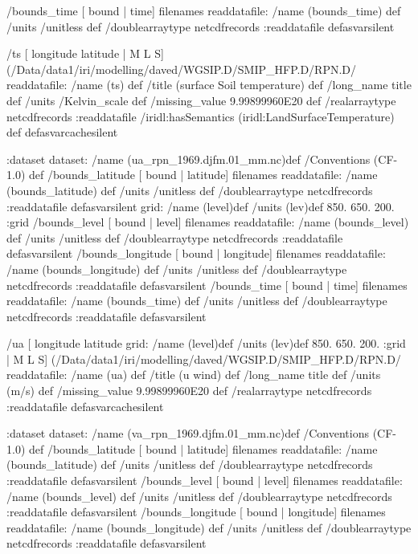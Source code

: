  /bounds_time{
[ bound | time] filenames readdatafile:
/name (bounds_time) def
 /units /unitless def
 /doublearraytype netcdfrecords :readdatafile
}defasvarsilent
\begin{ingrid}
 /ts{
[ longitude latitude | M L S]
(/Data/data1/iri/modelling/daved/WGSIP.D/SMIP_HFP.D/RPN.D/%
readdatafile:
/name (ts) def
 /title (surface Soil temperature) def
/long_name title def
 /units /Kelvin_scale def
 /missing_value 9.99899960E20 def
 /realarraytype netcdfrecords :readdatafile
/iridl:hasSemantics (iridl:LandSurfaceTemperature) def
}defasvarcachesilent
\end{ingrid}
:dataset
dataset:
/name (ua_rpn_1969.djfm.01_mm.nc)def
 /Conventions (CF-1.0) def
 /bounds_latitude{
[ bound | latitude] filenames readdatafile:
/name (bounds_latitude) def
 /units /unitless def
 /doublearraytype netcdfrecords :readdatafile
}defasvarsilent
grid:
/name (level)def
/units (lev)def
 850. 650. 200.
:grid
 /bounds_level{
[ bound | level] filenames readdatafile:
/name (bounds_level) def
 /units /unitless def
 /doublearraytype netcdfrecords :readdatafile
}defasvarsilent
 /bounds_longitude{
[ bound | longitude] filenames readdatafile:
/name (bounds_longitude) def
 /units /unitless def
 /doublearraytype netcdfrecords :readdatafile
}defasvarsilent
 /bounds_time{
[ bound | time] filenames readdatafile:
/name (bounds_time) def
 /units /unitless def
 /doublearraytype netcdfrecords :readdatafile
}defasvarsilent
\begin{ingrid}
 /ua{
[ longitude latitude 
grid:
/name (level)def
/units (lev)def
 850. 650. 200.
:grid
| M L S]
(/Data/data1/iri/modelling/daved/WGSIP.D/SMIP_HFP.D/RPN.D/%
readdatafile:
/name (ua) def
 /title (u wind) def
/long_name title def
 /units  (m/s) def
 /missing_value 9.99899960E20 def
 /realarraytype netcdfrecords :readdatafile
}defasvarcachesilent
\end{ingrid}
:dataset
dataset:
/name (va_rpn_1969.djfm.01_mm.nc)def
 /Conventions (CF-1.0) def
 /bounds_latitude{
[ bound | latitude] filenames readdatafile:
/name (bounds_latitude) def
 /units /unitless def
 /doublearraytype netcdfrecords :readdatafile
}defasvarsilent
 /bounds_level{
[ bound | level] filenames readdatafile:
/name (bounds_level) def
 /units /unitless def
 /doublearraytype netcdfrecords :readdatafile
}defasvarsilent
 /bounds_longitude{
[ bound | longitude] filenames readdatafile:
/name (bounds_longitude) def
 /units /unitless def
 /doublearraytype netcdfrecords :readdatafile
}defasvarsilent

